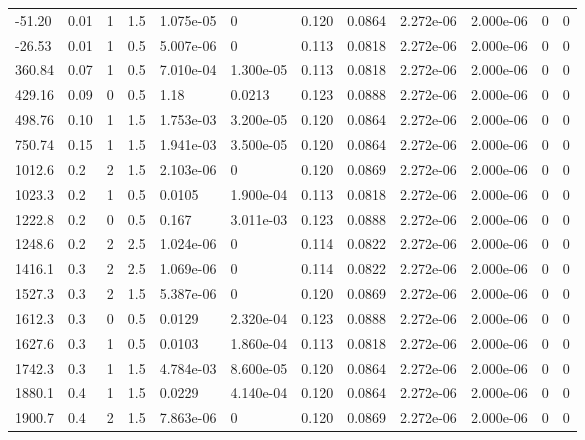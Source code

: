 \documentclass[preview]{standalone}
\begin{document}
{{\begin{tabular}{L{1.2cm}C{1.2cm} C{0.3cm}C{0.5cm} C{1.4cm}C{1.4cm} C{1.4cm}C{1.4cm} C{1.6cm}C{1.6cm} C{1.6cm}C{1.6cm}}
  -51.20  &  0.01  & 1     & 1.5 &  1.075e-05  & 0  &  0.120&   0.0864& 2.272e-06 & 2.000e-06   &  0 & 0  \\ 
  -26.53  &  0.01  & 1     & 0.5 &  5.007e-06  & 0  &  0.113&   0.0818& 2.272e-06 & 2.000e-06   &  0 & 0  \\ 
  360.84  &  0.07  & 1     & 0.5 &  7.010e-04  & 1.300e-05  &  0.113&   0.0818& 2.272e-06 & 2.000e-06   &  0 & 0  \\ 
  429.16  &  0.09  & 0     & 0.5 &  1.18  & 0.0213  &  0.123&   0.0888& 2.272e-06 & 2.000e-06   &  0 & 0  \\ 
  498.76  &  0.10  & 1     & 1.5 &  1.753e-03  & 3.200e-05  &  0.120&   0.0864& 2.272e-06 & 2.000e-06   &  0 & 0  \\ 
  750.74  &  0.15  & 1     & 1.5 &  1.941e-03  & 3.500e-05  &  0.120&   0.0864& 2.272e-06 & 2.000e-06   &  0 & 0  \\ 
  1012.6  &   0.2  & 2     & 1.5 &  2.103e-06  & 0  &  0.120&   0.0869& 2.272e-06 & 2.000e-06   &  0 & 0  \\ 
  1023.3  &   0.2  & 1     & 0.5 &  0.0105  & 1.900e-04  &  0.113&   0.0818& 2.272e-06 & 2.000e-06   &  0 & 0  \\ 
  1222.8  &   0.2  & 0     & 0.5 &  0.167  & 3.011e-03  &  0.123&   0.0888& 2.272e-06 & 2.000e-06   &  0 & 0  \\ 
  1248.6  &   0.2  & 2     & 2.5 &  1.024e-06  & 0  &  0.114&   0.0822& 2.272e-06 & 2.000e-06   &  0 & 0  \\ 
  1416.1  &   0.3  & 2     & 2.5 &  1.069e-06  & 0  &  0.114&   0.0822& 2.272e-06 & 2.000e-06   &  0 & 0  \\ 
  1527.3  &   0.3  & 2     & 1.5 &  5.387e-06  & 0  &  0.120&   0.0869& 2.272e-06 & 2.000e-06   &  0 & 0  \\ 
  1612.3  &   0.3  & 0     & 0.5 &  0.0129  & 2.320e-04  &  0.123&   0.0888& 2.272e-06 & 2.000e-06   &  0 & 0  \\ 
  1627.6  &   0.3  & 1     & 0.5 &  0.0103  & 1.860e-04  &  0.113&   0.0818& 2.272e-06 & 2.000e-06   &  0 & 0  \\ 
  1742.3  &   0.3  & 1     & 1.5 &  4.784e-03  & 8.600e-05  &  0.120&   0.0864& 2.272e-06 & 2.000e-06   &  0 & 0  \\ 
  1880.1  &   0.4  & 1     & 1.5 &  0.0229  & 4.140e-04  &  0.120&   0.0864& 2.272e-06 & 2.000e-06   &  0 & 0  \\ 
  1900.7  &   0.4  & 2     & 1.5 &  7.863e-06  & 0  &  0.120&   0.0869& 2.272e-06 & 2.000e-06   &  0 & 0  \\ 

\end{tabular}}}
\end{document}

